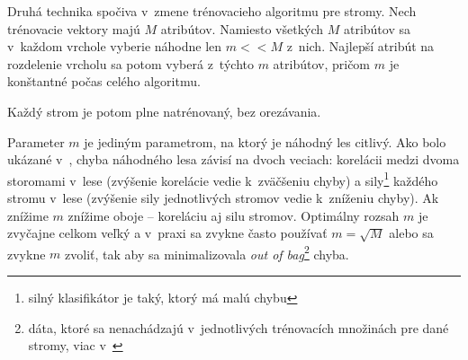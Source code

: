 Druhá technika spočiva v~zmene trénovacieho algoritmu pre stromy. Nech trénovacie vektory majú $M$ atribútov. Namiesto všetkých $M$ atribútov sa v~každom vrchole vyberie náhodne len $m<<M$ z~nich. Najlepší atribút na rozdelenie vrcholu sa potom vyberá z~týchto $m$ atribútov, pričom $m$ je konštantné počas celého algoritmu.

Každý strom je potom plne natrénovaný, bez orezávania.

Parameter $m$ je jediným parametrom, na ktorý je náhodný les citlivý. Ako bolo ukázané v~\cite{randomForestPaper}, chyba náhodného lesa závisí na dvoch veciach: korelácii medzi dvoma storomami v~lese (zvýšenie korelácie vedie k~zväčšeniu chyby) a sily\footnote{silný klasifikátor je taký, ktorý má malú chybu} každého stromu v~lese (zvýšenie sily jednotlivých stromov vedie k~zníženiu chyby). Ak znížime $m$ znížime oboje -- koreláciu aj silu stromov. Optimálny rozsah $m$ je zvyčajne celkom veľký a v~praxi sa zvykne často používať $m = \sqrt{M}$ alebo sa zvykne $m$ zvoliť, tak aby sa minimalizovala \textit{out of bag}\footnote{dáta, ktoré sa nenachádzajú v~jednotlivých trénovacích množinách pre dané stromy, viac v~\cite{randomForest}} chyba.



